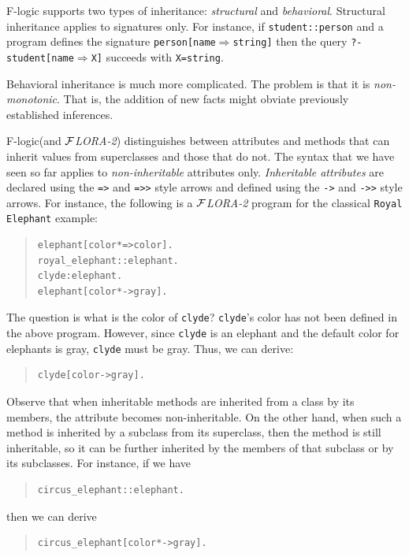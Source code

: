 \documentclass[11pt]{article}
\newcommand{\Fd}{\ensuremath{{\Rightarrow}}}                      %
\newcommand{\FLORA}{{\mbox{${\cal F}${\small\it LORA}\rm\emph{-2}}}\xspace}
\newcommand{\fl}{\mbox{F-logic}\xspace}
\begin{document}
\fl supports two types of inheritance: \emph{structural} and
\emph{behavioral}.  Structural inheritance applies to signatures only. For
instance, if {\tt student::person} and a program defines the signature
{\tt person[name{\Fd}string]} then the query {\tt ?- student[name{\Fd}X]}
succeeds with {\tt X=string}.

Behavioral inheritance is much more complicated. The problem  is that it is
\emph{non-monotonic}. That is, the addition of new facts might obviate previously
established inferences.

\fl (and \FLORA) distinguishes between attributes and methods that can
inherit values from superclasses and those that do not. The syntax that we
have seen so far applies to \emph{non-inheritable} attributes only.
\emph{Inheritable attributes} are declared using the {\tt *=>} and {\tt *=>>}
style arrows and defined using the {\tt *->} and {\tt *->>} style arrows. For
instance, the following is a \FLORA program for the classical {\tt Royal
Elephant} example:
\begin{quote}
\begin{verbatim}
elephant[color*=>color].
royal_elephant::elephant.
clyde:elephant.
elephant[color*->gray].
\end{verbatim}
\end{quote}
The question is what is the color of {\tt clyde}?
{\tt clyde}'s color has not been defined in the above program. However, since
{\tt clyde} is an elephant and the default color for elephants is gray,
{\tt clyde}
must be gray. Thus, we can derive:
\begin{quote}
\begin{verbatim}
clyde[color->gray].  
\end{verbatim}
\end{quote}
Observe that when inheritable methods are inherited from a class by its
members, the attribute becomes non-inheritable. On the other hand, when
such a method is inherited by a subclass from its superclass, then the
method is still inheritable, so it can be further inherited by the members
of that subclass or by its subclasses. For instance, if we have
\begin{quote}
\begin{verbatim}
circus_elephant::elephant.
\end{verbatim}
\end{quote}
then we can derive 
\begin{quote}
\begin{verbatim}
circus_elephant[color*->gray].  
\end{verbatim}
\end{quote}
\end{document}
